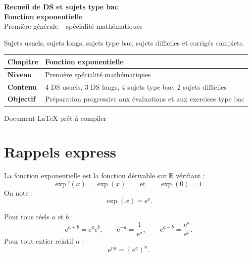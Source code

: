 \documentclass[11pt,a4paper]{article}
\newcommand{\R}{\mathbb{R}}
\newcommand{\e}{\mathrm{e}}
\begin{document}
\begin{titlepage}
\centering
\vspace*{1.5cm}

{\Huge \textbf{Recueil de DS et sujets type bac}}\\[0.3cm]
{\Huge \textbf{Fonction exponentielle}}\\[0.5cm]
{\Large Première générale -- spécialité mathématiques}\\[1cm]

\begin{tcolorbox}[colback=blue!5,colframe=bleu,width=0.9\textwidth]
\centering
\Large
Sujets usuels, sujets longs, sujets type bac, sujets difficiles et corrigés complets.
\end{tcolorbox}

\vfill

\begin{tabular}{|>{\bfseries}l|l|}
\hline
Chapitre & Fonction exponentielle \\
\hline
Niveau & Première spécialité mathématiques \\
\hline
Contenu & 4 DS usuels, 3 DS longs, 4 sujets type bac, 2 sujets difficiles \\
\hline
Objectif & Préparation progressive aux évaluations et aux exercices type bac \\
\hline
\end{tabular}

\vfill

{\large Document LaTeX prêt à compiler}

\end{titlepage}

\tableofcontents
\newpage

\section{Rappels express}

\begin{rappelbox}
La fonction exponentielle est la fonction dérivable sur $\R$ vérifiant :
\[
\exp'(x)=\exp(x)
\qquad \text{et} \qquad
\exp(0)=1.
\]
On note :
\[
\exp(x)=\e^x.
\]
\end{rappelbox}

\begin{rappelbox}
Pour tous réels $a$ et $b$ :
\[
\e^{a+b}=\e^a\e^b,
\qquad
\e^{-a}=\frac{1}{\e^a},
\qquad
\e^{a-b}=\frac{\e^a}{\e^b}.
\]
Pour tout entier relatif $n$ :
\[
\e^{na}=(\e^a)^n.
\]
\end{rappelbox}
\end{document}
